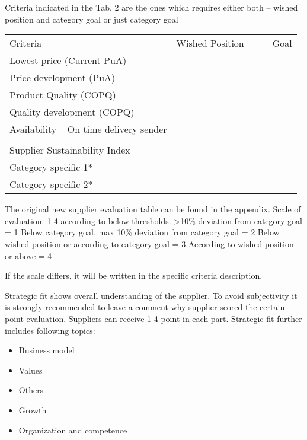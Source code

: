 \documentclass[oneside,12pt]{article}%
\begin{document}

Criteria indicated in the Tab. 2  are the ones which requires either both – wished position and category goal or just category goal

\begin{table}[h]
  \tiny
  \begin{tabular}{lllll}
    Criteria                               & Wished Position &  &  & Goal \\
    Lowest price (Current PuA)             &                 &  &  &      \\
    Price development (PuA)                &                 &  &  &      \\
    Product Quality (COPQ)                 &                 &  &  &      \\
    Quality development (COPQ)             &                 &  &  &      \\
    Availability – On time delivery sender &                 &  &  &      \\
    &                 &  &  &      \\
    Supplier Sustainability Index          &                 &  &  &      \\
    Category specific 1*                   &                 &  &  &      \\
    Category specific 2*                   &                 &  &  &
  \end{tabular}
\end{table}

The original new supplier evaluation table can be found in the appendix.
Scale of evaluation: 1-4 according to below thresholds.
>10\% deviation from category goal = 1
Below category goal, max 10\% deviation from category goal = 2
Below wished position or according to category goal = 3
According to wished position or above = 4

If the scale differs, it will be written in the specific criteria description.

Strategic fit shows overall understanding of the supplier. To avoid subjectivity it is strongly recommended to leave a comment why supplier scored the certain point evaluation. Suppliers can receive 1-4 point in each part. Strategic fit further includes following topics:
\begin{itemize}
  \item Business model
  \item Values
  \item Others
  \item Growth
  \item Organization and competence
\end{itemize}
\end{document}
